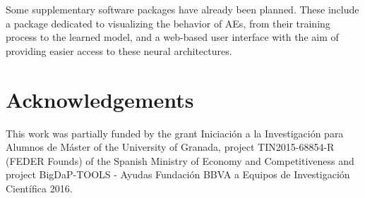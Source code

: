 Some supplementary software packages have already been planned. These include a package dedicated to visualizing the behavior of AEs, from their training process to the learned model, and a web-based user interface with the aim of providing easier access to these neural architectures.


\section*{Acknowledgements}
\label{p2sec.acknowledgements}

This work was partially funded by the grant Iniciaci{\'o}n a la Investigaci{\'o}n para Alumnos de M{\'a}ster of the University of Granada, project TIN2015-68854-R (FEDER Founds) of the Spanish Ministry of Economy and Competitiveness and project BigDaP-TOOLS - Ayudas
Fundaci{\'o}n BBVA a Equipos de Investigaci{\'o}n  Cient{\'i}fica
2016.



% 
%


